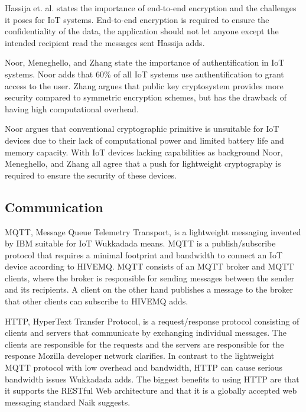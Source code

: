 Hassija et. al. states the importance of end-to-end encryption and the challenges it poses for IoT systems.\cite{Hassija2019}
End-to-end encryption is required to ensure the confidentiality of the data, the application should not let anyone except the intended recipient read the messages sent Hassija adds.\cite{Hassija2019}

Noor, Meneghello, and Zhang state the importance of authentification in IoT systems.\cite{Noor2019,Meneghello2019,Zhang2014} 
Noor adds that 60\% of all IoT systems use authentification to grant access to the user.\cite{Noor2019}  
Zhang argues that public key cryptosystem provides more security compared to symmetric encryption schemes, but has the drawback of having high computational overhead.\cite{Zhang2014} 

Noor argues that conventional cryptographic primitive is unsuitable for IoT devices due to their lack of computational power and limited battery life and memory capacity.\cite{Noor2019}
With IoT devices lacking capabilities as background Noor, Meneghello, and Zhang all agree that a push for lightweight cryptography is required to ensure the security of these devices.\cite {Noor2019,Meneghello2019,Zhang2014} 

\subsection{Communication} 
MQTT, Message Queue Telemetry Transport, is a lightweight messaging invented by IBM suitable for IoT Wukkadada means.\cite{Wukkadada2018} 
MQTT is a publish/subscribe protocol that requires a minimal footprint and bandwidth to connect an IoT device according to HIVEMQ.\cite{MQTT2021}
MQTT consists of an MQTT broker and MQTT clients, where the broker is responsible for sending messages between the sender and its recipients.\cite{Wukkadada2018}
A client on the other hand publishes a message to the broker that other clients can subscribe to HIVEMQ adds.\cite{MQTT2021}

HTTP, HyperText Transfer Protocol, is a request/response protocol consisting of clients and servers that communicate by exchanging individual messages. 
The clients are responsible for the requests and the servers are responsible for the response Mozilla developer network clarifies. \cite{HTTP2021} 
In contrast to the lightweight MQTT protocol with low overhead and bandwidth, HTTP can cause serious bandwidth issues Wukkadada adds. \cite{Wukkadada2018}
The biggest benefits to using HTTP are that it supports the RESTful Web architecture and that it is a globally accepted web messaging standard Naik suggests. \cite{Naik2017} 

